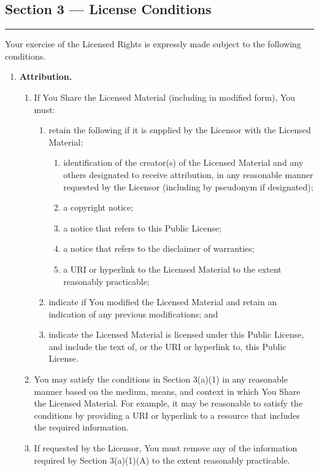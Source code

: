 \subsection*{Section 3 --- License Conditions}
\noindent\rule{\textwidth}{0.3pt}
\smallskip

Your exercise of the Licensed Rights is expressly made subject to the following conditions.

\begin{enumerate}[label=(\alph*), leftmargin=1.8em, labelwidth=1.5em, align=left, itemsep=0.6em]
	\item \textbf{Attribution.}
	      \begin{enumerate}[label=\arabic*., leftmargin=1.8em, labelwidth=1.2em, align=left, itemsep=0.4em]
		      \item If You Share the Licensed Material (including in modified form), You must:
		            \begin{enumerate}[label=(\alph*), leftmargin=1.8em, labelwidth=1.5em, align=left, itemsep=0.2em]
			            \item retain the following if it is supplied by the Licensor with the Licensed Material:
			                  \begin{enumerate}[label=\roman*., leftmargin=2em, labelwidth=1.8em, align=left, itemsep=0.1em]
				                  \item identification of the creator(s) of the Licensed Material and any others designated to receive attribution, in any reasonable manner requested by the Licensor (including by pseudonym if designated);
				                  \item a copyright notice;
				                  \item a notice that refers to this Public License;
				                  \item a notice that refers to the disclaimer of warranties;
				                  \item a URI or hyperlink to the Licensed Material to the extent reasonably practicable;
			                  \end{enumerate}
			            \item indicate if You modified the Licensed Material and retain an indication of any previous modifications; and
			            \item indicate the Licensed Material is licensed under this Public License, and include the text of, or the URI or hyperlink to, this Public License.
		            \end{enumerate}
		      \item You may satisfy the conditions in Section 3(a)(1) in any reasonable manner based on the medium, means, and context in which You Share the Licensed Material. For example, it may be reasonable to satisfy the conditions by providing a URI or hyperlink to a resource that includes the required information.
		      \item If requested by the Licensor, You must remove any of the information required by Section 3(a)(1)(A) to the extent reasonably practicable.
	      \end{enumerate}


\end{enumerate}
